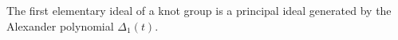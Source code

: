 The first elementary ideal of a knot group is a principal ideal generated by the Alexander polynomial $\Delta_1(t)$.
